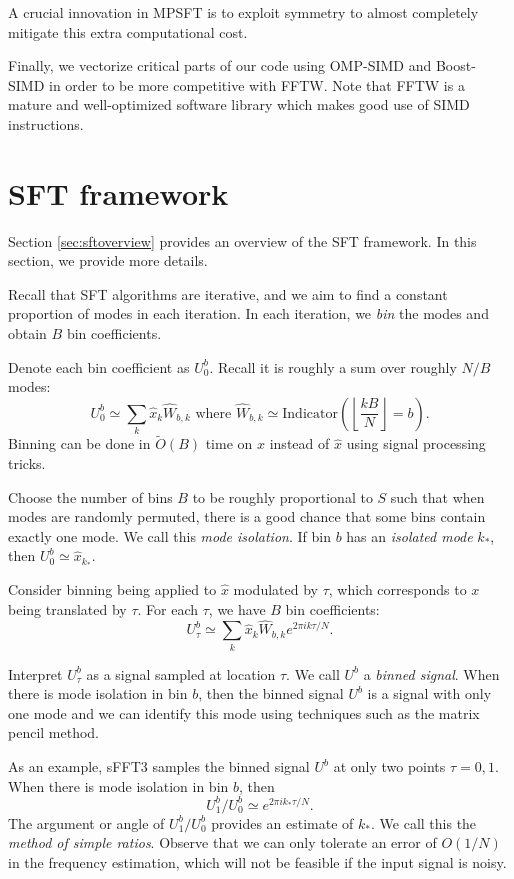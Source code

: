 \documentclass[10pt]{article}
\begin{document}
A crucial innovation in MPSFT is to exploit symmetry to almost completely mitigate this extra computational cost.

Finally, we vectorize critical parts of our code using OMP-SIMD and Boost-SIMD in order to be more competitive with FFTW. Note that FFTW is a mature and well-optimized software library which makes good use of SIMD instructions.

\section{SFT framework}

Section \ref{sec:sftoverview} provides an overview of the SFT framework. In this section, we provide more details.

Recall that SFT algorithms are iterative, and we aim to find a constant proportion of modes in each iteration. In each iteration, we \emph{bin} the modes and obtain $B$ bin coefficients.

Denote each bin coefficient as $U^b_0$. Recall it is roughly a sum over roughly $N/B$ modes:
$$U^b_0 \simeq \sum_k \hat{x}_k \hat{W}_{b,k} \text{ where } \hat{W}_{b,k} \simeq \text{Indicator}\left(\left\lfloor \frac{kB}{N} \right\rfloor = b\right).$$
Binning can be done in $\tilde{O}(B)$ time on $x$ instead of $\hat{x}$ using signal processing tricks.

Choose the number of bins $B$ to be roughly proportional to $S$ such that when modes are randomly permuted, there is a good chance that some bins contain exactly one mode. We call this \emph{mode isolation}. If bin $b$ has an \emph{isolated mode} $k_*$, then $U^b_0 \simeq \hat{x}_{k_*}$.

Consider binning being applied to $\hat{x}$ modulated by $\tau$, which corresponds to $x$ being translated by $\tau$. For each $\tau$, we have $B$ bin coefficients:
$$U^b_{\tau} \simeq \sum_k \hat{x}_k \hat{W}_{b,k} e^{2\pi i k \tau/N}.$$

Interpret $U^b_{\tau}$ as a signal sampled at location $\tau$. We call $U^b$ a \emph{binned signal}. When there is mode isolation in bin $b$, then the binned signal $U^b$ is a signal with only one mode and we can identify this mode using techniques such as the matrix pencil method.

As an example, sFFT3 samples the binned signal $U^b$ at only two points $\tau=0,1$. When there is mode isolation in bin $b$, then
$$U^b_1/U^b_0 \simeq e^{2\pi i k_*\tau/N}.$$
The argument or angle of $U_1^b/U^b_0$ provides an estimate of $k_*$. We call this the \emph{method of simple ratios}. Observe that we can only tolerate an error of $O(1/N)$ in the frequency estimation, which will not be feasible if the input signal is noisy.
\end{document}
